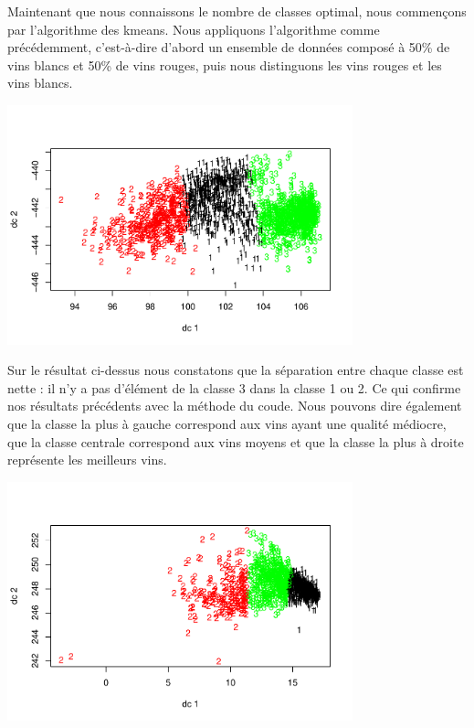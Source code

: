 \documentclass[
]{article}
\begin{document}
Maintenant que nous connaissons le nombre de classes optimal, nous commençons par l'algorithme des kmeans. Nous appliquons l'algorithme comme précédemment, c'est-à-dire d'abord un ensemble de
données composé à 50\% de vins blancs et 50\% de vins rouges, puis nous
distinguons les vins rouges et les vins blancs.

\begin{center}
	\includegraphics[width=10cm]{repport_files/figure-latex/unnamed-chunk-7-1.pdf}
\end{center}

Sur le résultat ci-dessus nous constatons que la séparation entre chaque
classe est nette : il n'y a pas d'élément de la classe 3 dans la classe
1 ou 2. Ce qui confirme nos résultats précédents avec la méthode du
coude. Nous pouvons dire également que la classe la plus à gauche
correspond aux vins ayant une qualité médiocre, que la classe centrale
correspond aux vins moyens et que la classe la plus à droite représente
les meilleurs vins.

\begin{center}
	\includegraphics[width=10cm]{repport_files/figure-latex/unnamed-chunk-8-1.pdf}
\end{center}
\end{document}
